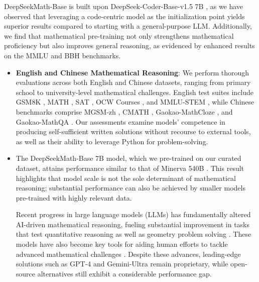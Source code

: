 DeepSeekMath-Base is built upon DeepSeek-Coder-Base-v1.5 7B \citep{deepseek-coder}, as we have observed that leveraging a code-centric model as the initialization point yields superior results compared to starting with a general-purpose LLM. Additionally, we find that mathematical pre-training not only strengthens mathematical proficiency but also improves general reasoning, as evidenced by enhanced results on the MMLU \citep{mmlu} and BBH \citep{bbh} benchmarks.

\begin{itemize}[topsep=0pt]
    \item \textbf{English and Chinese Mathematical Reasoning}: We perform thorough evaluations across both English and Chinese datasets, ranging from primary school to university-level mathematical challenges. English test suites include GSM8K \citep{gsm8k}, MATH \citep{MATH}, SAT \citep{llemma}, OCW Courses \citep{minerva}, and MMLU-STEM \citep{mmlu}, while Chinese benchmarks comprise MGSM-zh \citep{mgsm}, CMATH \citep{wei2023cmath}, Gaokao-MathCloze \citep{agieval}, and Gaokao-MathQA \citep{agieval}. Our assessments examine models' competence in producing self-sufficient written solutions without recourse to external tools, as well as their ability to leverage Python for problem-solving.

    \item The DeepSeekMath-Base 7B model, which we pre-trained on our curated dataset, attains performance similar to that of Minerva 540B \citep{minerva}. This result highlights that model scale is not the sole determinant of mathematical reasoning; substantial performance can also be achieved by smaller models pre-trained with highly relevant data.

Recent progress in large language models (LLMs) has fundamentally altered AI-driven mathematical reasoning, fueling substantial improvement in tasks that test quantitative reasoning \citep{MATH} as well as geometry problem solving \citep{trinh2024solving}. These models have also become key tools for aiding human efforts to tackle advanced mathematical challenges \citep{tao}. Despite these advances, leading-edge solutions such as GPT-4 \citep{gpt4} and Gemini-Ultra \citep{gemini} remain proprietary, while open-source alternatives still exhibit a considerable performance gap.


\end{itemize}
